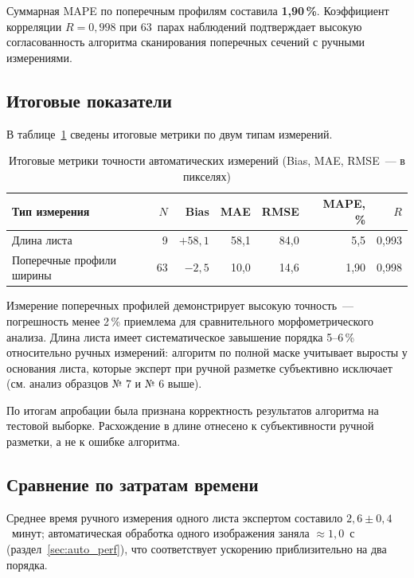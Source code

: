 Суммарная MAPE по поперечным профилям составила \textbf{1{,}90\,\%}. Коэффициент корреляции $R = 0{,}998$ при 63~парах наблюдений подтверждает
высокую согласованность алгоритма сканирования поперечных сечений с ручными измерениями.

\subsection{Итоговые показатели}

В таблице~\ref{tab:summary} сведены итоговые метрики по двум типам измерений.

\begin{table}[H]
\centering
\small
\caption{Итоговые метрики точности автоматических измерений (Bias, MAE, RMSE~--- в пикселях)}
\label{tab:summary}
\begin{tabular}{lrrrrrr}
\hline
\textbf{Тип измерения} & $N$ & \textbf{Bias} & \textbf{MAE} & \textbf{RMSE} & \textbf{MAPE, \%} & $R$ \\
\hline
Длина листа              &  9 & $+58{,}1$ & 58{,}1 & 84{,}0 & 5{,}5  & 0{,}993 \\
Поперечные профили ширины& 63 &  $-2{,}5$ & 10{,}0 & 14{,}6 & 1{,}90 & 0{,}998 \\
\hline
\end{tabular}
\end{table}

Измерение поперечных профилей демонстрирует высокую точность~--- погрешность
менее 2\,\% приемлема для сравнительного морфометрического анализа.
Длина листа имеет систематическое завышение порядка 5--6\,\% относительно
ручных измерений: алгоритм по полной маске учитывает выросты у основания
листа, которые эксперт при ручной разметке субъективно исключает (см. анализ
образцов № 7 и № 6 выше).

По итогам апробации была признана корректность результатов алгоритма на тестовой выборке. Расхождение в длине отнесено к субъективности ручной разметки, а не к ошибке алгоритма.

\subsection{Сравнение по затратам времени}

Среднее время ручного измерения одного листа экспертом составило
$2{,}6 \pm 0{,}4$~минут; автоматическая обработка одного изображения заняла
$\approx 1{,}0$~с (раздел~\ref{sec:auto_perf}), что соответствует ускорению
приблизительно на два порядка.

